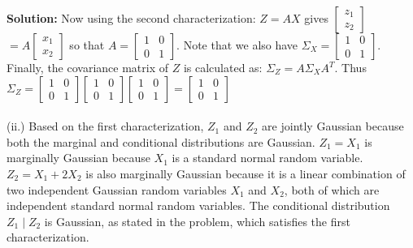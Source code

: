 \documentclass{article}
\newenvironment{solution}{\color{blue} \smallskip \textbf{Solution:}}{}
\begin{document}
\begin{enumerate}[(a)]
\begin{solution}
Now using the second characterization: $Z = A X$ gives $\begin{bmatrix} z_1 \\ z_2 \end{bmatrix}$ $= A \begin{bmatrix} x_1 \\ x_2 \end{bmatrix}$  so that $A = \begin{bmatrix} 1 & 0 \\ 0 & 1 \end{bmatrix}$. Note that we also have $\Sigma_X = \begin{bmatrix} 1 & 0 \\ 0 & 1 \end{bmatrix}$. \\

Finally, the covariance matrix of \(Z\) is calculated as: $\Sigma_Z = A \Sigma_X A^T$. Thus
$\Sigma_Z = \begin{bmatrix} 1 & 0 \\ 0 & 1 \end{bmatrix} 
\begin{bmatrix} 1 & 0 \\ 0 & 1 \end{bmatrix} 
\begin{bmatrix} 1 & 0 \\ 0 & 1 \end{bmatrix} 
= \begin{bmatrix} 1 & 0 \\ 0 & 1 \end{bmatrix}$\\\\

        (ii.)
Based on the first characterization, \(Z_1\) and \(Z_2\) are jointly Gaussian because both the marginal and conditional distributions are Gaussian. 
\(Z_1 = X_1\) is marginally Gaussian because \(X_1\) is a standard normal random variable. 
\(Z_2 = X_1 + 2X_2\) is also marginally Gaussian because it is a linear combination of two independent Gaussian random variables \(X_1\) and \(X_2\), both of which are independent standard normal random variables. The conditional distribution \(Z_1 \mid Z_2\) is Gaussian, as stated in the problem, which satisfies the first characterization.\\


\end{solution}
\end{enumerate}
\end{document}
